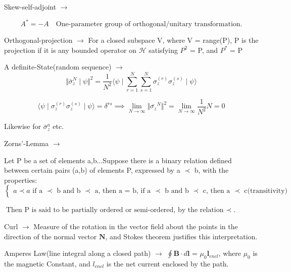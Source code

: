 \documentclass[a4paper, 10pt, onepage]{elegantbook}
\begin{document}
{Skew-self-adjoint $\longrightarrow$

\begin{equation}
A^* = - A \quad \text{One-parameter group of orthogonal/unitary transformation.}
\end{equation}

Orthogonal-projection $\longrightarrow$ For a closed subspace V, where V = range(P), P is the projection if it is any 
bounded operator
on $\mathscr H$ satisfying $P^2$ = P, and $P^*$ = P 
 
A definite-State(random sequence) $\longrightarrow$
\begin{equation}
\Vert \bar{\sigma}_z^{N} \mid \psi \Vert^2 = \frac{1}{N^2} \langle \psi \mid \sum_{r=1}^N \sum_{s=1}^N 
\sigma_z^{(r)}\sigma_z^{(s)} \mid \psi \rangle
\end{equation}

\begin{equation}
\langle \psi \mid \sigma_z^{(r)} \sigma_z^{(s)} \mid \psi \rangle = \delta^{rs}
\implies \lim_{N \to \infty} \Vert \bar{\sigma_z}^{N} \Vert^2 = \lim_{N \to \infty} \frac{1}{N^2}N = 0
\end{equation}

Likewise for $\bar{\sigma}_z^a$ etc.  

Zorns'-Lemma $\longrightarrow$  

Let P be a set of elements a,b...Suppose there is a binary relation defined between certain pairs (a,b) of elements P,
expressed by a $\prec$ b, with the properties:  $\left\{
            \begin{array}{ll}
            a \prec a 
            \text{ if a $\prec$ b and b $\prec$ a, then a = b,} 
            \text{ if a $\prec$ b and b $\prec$ c, then a $\prec$ c(transitivity)} 
            \end{array} 
            \right.$
\medskip

$\text{Then P is said to be partially ordered or semi-ordered, by the relation $\prec$}$.

Curl $\longrightarrow$ Measure of the rotation in the vector field about the points in the direction of the 
normal vector $\mathbf N$, and Stokes theorem justifies this interpretation. 
 
Amperes Law(line integral along a closed path) $\longrightarrow$ $\oint \mathbf B \cdot d \mathbf l$ = $\mu_0 \mathbf 
l_{encl}$,
where $\mu_0$ is the magnetic Constant, and $l_{encl}$ is the net current enclosed by the path.
  
}
\end{document}
